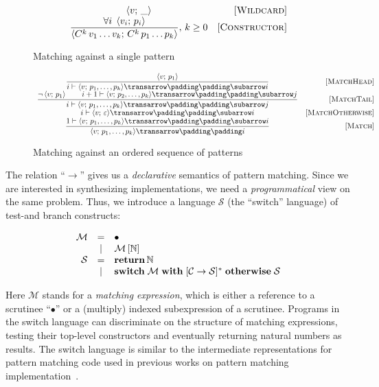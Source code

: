 \begin{figure}[t]
   \renewcommand*{\arraystretch}{2}
   \[
   \begin{array}{cr}
     \left<{v;\,\_}\right> & \mbox{[\textsc{Wildcard}]} \\
     \dfrac{\forall i\;\left<{v_i;\,p_i}\right>}{\left<{C^k\,v_1\dots v_k;\,C^k\,p_1\dots p_k}\right>},\,k\ge 0 & \mbox{[\textsc{Constructor}]}
   \end{array}
   \]
   \caption{Matching against a single pattern}
   \label{fig:match1pat}
\end{figure}

\begin{figure}[t]
   \renewcommand*{\arraystretch}{3}
   \setarrow{\xrightarrow}
   \setsubarrow{_*}
   \[
   \begin{array}{cr}
     \trule{\inbr{v;\,p_1}}
           {\withenv{i}{\trans{\inbr{v;\,p_1,\dots,p_k}}{}{i}}} & \ruleno{MatchHead}\\
     \trule{\neg\inbr{v;\,p_1}\qquad\withenv{i+1}{\trans{\inbr{v;\,p_2,\dots,p_k}}{}{j}}}
           {\withenv{i}{\trans{\inbr{v;\,p_1,\dots,p_k}}{}{j}}} & \ruleno{MatchTail}\\
     \withenv{i}{\trans{\inbr{v;\,\varepsilon}}{}{i}} & \ruleno{MatchOtherwise}\\
     \trule{\withenv{1}{\trans{\inbr{v;\,p_1,\dots,p_k}}{}{i}}}
           {\setsubarrow{}\trans{\inbr{v;\,p_1,\dots,p_k}}{}{i}} & \ruleno{Match}
   \end{array}
   \]
   \caption{Matching against an ordered sequence of patterns}
   \label{fig:matchpatts}
\end{figure}

The relation ``$\xrightarrow{}{}\!\!$'' gives us a \emph{declarative} semantics of pattern matching. Since we are interested in
synthesizing implementations, we need a \emph{programmatical} view on the same problem. Thus, we introduce a language $\mathcal S$
(the ``switch'' language) of test-and branch constructs:

\[
\begin{array}{rcl}
  \mathcal M & = & \bullet \\
  & \mid  & \mathcal M\,[\mathbb{N}] \\
  \mathcal{S} & = & \mathbf{return}\,\mathbb{N} \\
  &  \mid & \mathbf{switch}\;\mathcal{M}\;\mathbf{with}\; [\mathcal{C}\; \mathbf{\rightarrow}\; \mathcal{S}]^*\;\mathbf{otherwise}\;\mathcal{S}
\end{array}
\]
 
Here $\mathcal{M}$ stands for a \emph{matching expression}, which is either a reference to a scrutinee ``$\bullet$'' or
a (multiply) indexed subexpression of a scrutinee. Programs in the switch language can discriminate on the
structure of matching expressions, testing their top-level constructors and eventually returning natural numbers as results.
The switch language is similar to the intermediate representations for pattern matching code used in 
previous works on pattern matching implementation~\cite{maranget2001,maranget2008}.

